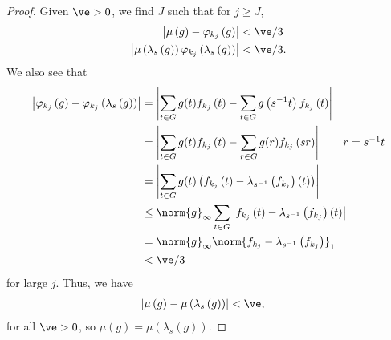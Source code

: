 \begin{proof}
  Given $\ve > 0$, we find $J$ such that for $j\geq J$,
  \begin{align*}
    \left\vert \mu\left(g\right) - \varphi_{k_j}\left(g\right) \right\vert &< \ve/3\\
    \left\vert \mu\left(\lambda_s\left(g\right)\right) \varphi_{k_j}\left(\lambda_s\left(g\right)\right)\right\vert &< \ve/3.
  \end{align*}
  We also see that
  \begin{align*}
    \left\vert \varphi_{k_j}\left(g\right) - \varphi_{k_j}\left(\lambda_s\left(g\right)\right) \right\vert &= \left\vert \sum_{t\in G}g(t)f_{k_j}\left(t\right) - \sum_{t\in G}g\left(s^{-1}t\right)f_{k_j}\left(t\right) \right\vert\\
                                                                                                           &= \left\vert \sum_{t\in G}g(t)f_{k_j}\left(t\right) - \sum_{r\in G}g(r)f_{k_j}\left(sr\right) \right\vert \tag*{$r = s^{-1}t$}\\
                                                                                                           &= \left\vert \sum_{t\in G}g(t)\left(f_{k_j}\left(t\right)-\lambda_{s^{-1}}\left(f_{k_j}\right)\left(t\right)\right) \right\vert\\
                                                                                                           &\leq \norm{g}_{\infty}\sum_{t\in G}\left\vert f_{k_j}\left(t\right) - \lambda_{s^{-1}}\left(f_{k_j}\right)\left(t\right) \right\vert\\
                                                                                                           &= \norm{g}_{\infty}\norm{f_{k_j} - \lambda_{s^{-1}}\left(f_{k_j}\right)}_{1}\\
                                                                                                           &< \ve/3
  \end{align*}
  for large $j$. Thus, we have
  \begin{align*}
    \left\vert \mu\left(g\right) - \mu\left(\lambda_{s}\left(g\right)\right) \right\vert &< \ve,
  \end{align*}
  for all $\ve > 0$, so $\mu\left(g\right) = \mu\left(\lambda_{s}\left(g\right)\right)$.
\end{proof}

